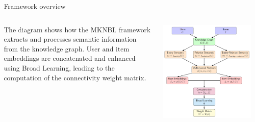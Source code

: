 \documentclass[11pt,pdf,hyperref={unicode}]{beamer}
\begin{document}
    \begin{frame}{Framework overview}
        \begin{columns}
            \begin{column}{0.35\textwidth}
                The diagram shows how the MKNBL framework extracts and processes semantic information from the knowledge graph.
                User and item embeddings are concatenated and enhanced using Broad Learning, leading to the computation of the
                connectivity weight matrix.
            \end{column}
            \begin{column}{0.7\textwidth}
                \includegraphics[width=1.0\textwidth]{Kirill-Shevchenko-Step-3-fig}      
            \end{column}
        \end{columns}
    \end{frame}
\end{document}
